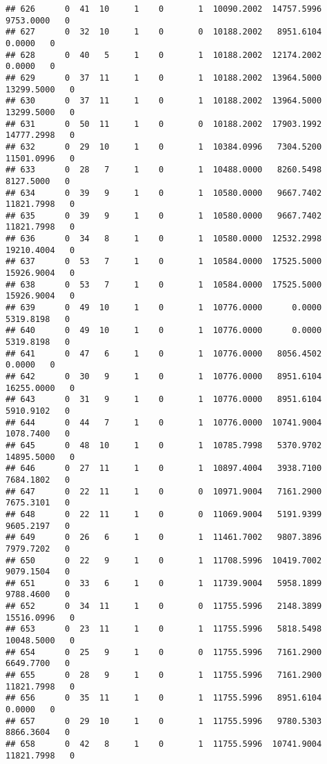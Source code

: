 \documentclass[
]{article}
\begin{document}
\begin{enumerate}
\begin{verbatim}
## 626      0  41  10     1    0       1  10090.2002  14757.5996   9753.0000   0
## 627      0  32  10     1    0       0  10188.2002   8951.6104      0.0000   0
## 628      0  40   5     1    0       1  10188.2002  12174.2002      0.0000   0
## 629      0  37  11     1    0       1  10188.2002  13964.5000  13299.5000   0
## 630      0  37  11     1    0       1  10188.2002  13964.5000  13299.5000   0
## 631      0  50  11     1    0       0  10188.2002  17903.1992  14777.2998   0
## 632      0  29  10     1    0       1  10384.0996   7304.5200  11501.0996   0
## 633      0  28   7     1    0       1  10488.0000   8260.5498   8127.5000   0
## 634      0  39   9     1    0       1  10580.0000   9667.7402  11821.7998   0
## 635      0  39   9     1    0       1  10580.0000   9667.7402  11821.7998   0
## 636      0  34   8     1    0       1  10580.0000  12532.2998  19210.4004   0
## 637      0  53   7     1    0       1  10584.0000  17525.5000  15926.9004   0
## 638      0  53   7     1    0       1  10584.0000  17525.5000  15926.9004   0
## 639      0  49  10     1    0       1  10776.0000      0.0000   5319.8198   0
## 640      0  49  10     1    0       1  10776.0000      0.0000   5319.8198   0
## 641      0  47   6     1    0       1  10776.0000   8056.4502      0.0000   0
## 642      0  30   9     1    0       1  10776.0000   8951.6104  16255.0000   0
## 643      0  31   9     1    0       1  10776.0000   8951.6104   5910.9102   0
## 644      0  44   7     1    0       1  10776.0000  10741.9004   1078.7400   0
## 645      0  48  10     1    0       1  10785.7998   5370.9702  14895.5000   0
## 646      0  27  11     1    0       1  10897.4004   3938.7100   7684.1802   0
## 647      0  22  11     1    0       0  10971.9004   7161.2900   7675.3101   0
## 648      0  22  11     1    0       0  11069.9004   5191.9399   9605.2197   0
## 649      0  26   6     1    0       1  11461.7002   9807.3896   7979.7202   0
## 650      0  22   9     1    0       1  11708.5996  10419.7002   9079.1504   0
## 651      0  33   6     1    0       1  11739.9004   5958.1899   9788.4600   0
## 652      0  34  11     1    0       0  11755.5996   2148.3899  15516.0996   0
## 653      0  23  11     1    0       1  11755.5996   5818.5498  10048.5000   0
## 654      0  25   9     1    0       0  11755.5996   7161.2900   6649.7700   0
## 655      0  28   9     1    0       1  11755.5996   7161.2900  11821.7998   0
## 656      0  35  11     1    0       1  11755.5996   8951.6104      0.0000   0
## 657      0  29  10     1    0       1  11755.5996   9780.5303   8866.3604   0
## 658      0  42   8     1    0       1  11755.5996  10741.9004  11821.7998   0

\end{verbatim}
\end{enumerate}
\end{document}
